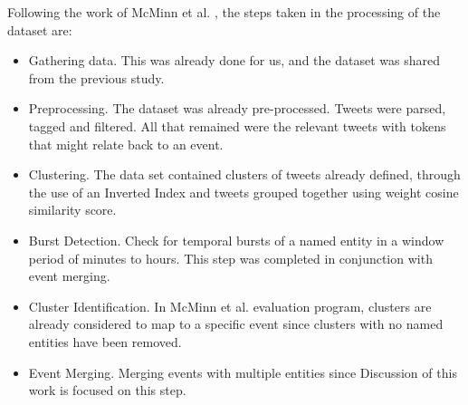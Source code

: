 \documentclass[a4paper,portrait,12pt]{article}
\begin{document}
Following the work of McMinn et al. \cite{McMinn2013}, the steps taken in the processing of the dataset are:
\begin{itemize}
	\item Gathering data. This was already done for us, and the dataset was shared from the previous study.
	\item Preprocessing. The dataset was already pre-processed. Tweets were parsed, tagged and filtered. All that remained were the relevant tweets with tokens that might relate back to an event.
	\item Clustering. The data set contained clusters of tweets already defined, through the use of an Inverted Index and tweets grouped together using weight cosine similarity score.
	\item Burst Detection. Check for temporal bursts of a named entity in a window period of minutes to hours. This step was completed in conjunction with event merging.
	\item Cluster Identification. In McMinn et al. \cite{McMinn2013} evaluation program, clusters are already considered to map to a specific event since clusters with no named entities have been removed.
	\item Event Merging. Merging events with multiple entities since  Discussion of this work is focused on this step.
\end{itemize}
\end{document}
